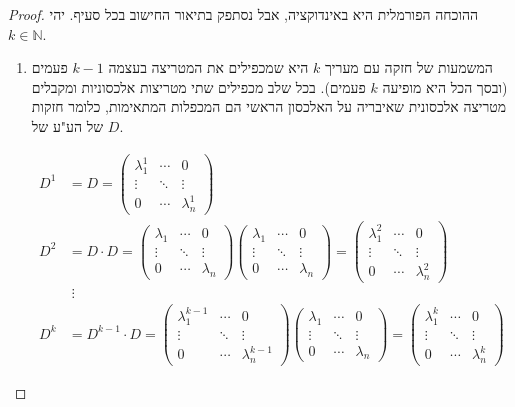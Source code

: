 \documentclass[12pt]{report}
\theoremstyle{plain}
\theoremstyle{definition}
\newcommand{\N}{\mathbb{N}}
\newcommand{\0}{\mathbf{0}}
\begin{document}
\begin{proof}
ההוכחה הפורמלית היא באינדוקציה, אבל נסתפק בתיאור החישוב בכל סעיף.
יהי 
$k\in\N$.
\begin{enumerate}[label=\alph*.]
\item 
המשמעות של חזקה עם מעריך
$k$
היא שמכפילים את המטריצה בעצמה
$k-1$
פעמים (ובסך הכל היא מופיעה 
$k$
פעמים).
בכל שלב מכפילים שתי מטריצות אלכסוניות ומקבלים מטריצה אלכסונית שאיבריה על האלכסון הראשי הם המכפלות המתאימות, כלומר חזקות של הע"ע של 
$D$.

$$
\begin{aligned}
D^1&=D=\begin{pmatrix}
\lambda_1^1 & \cdots & 0 \\
\vdots & \ddots & \vdots \\
0 & \cdots & \lambda_n^1
\end{pmatrix} \\
D^2&=D\cdot D=\begin{pmatrix}
\lambda_1 & \cdots & 0 \\
\vdots & \ddots & \vdots \\
0 & \cdots & \lambda_n
\end{pmatrix}\begin{pmatrix}
\lambda_1 & \cdots & 0 \\
\vdots & \ddots & \vdots \\
0 & \cdots & \lambda_n
\end{pmatrix}=\begin{pmatrix}
\lambda_1^2 & \cdots & 0 \\
\vdots & \ddots & \vdots \\
0 & \cdots & \lambda_n^2
\end{pmatrix} \\
&\;\vdots \\
D^k&=D^{k-1}\cdot D=\begin{pmatrix}
\lambda_1^{k-1} & \cdots & 0 \\
\vdots & \ddots & \vdots \\
0 & \cdots & \lambda_n^{k-1}
\end{pmatrix}\begin{pmatrix}
\lambda_1 & \cdots & 0 \\
\vdots & \ddots & \vdots \\
0 & \cdots & \lambda_n
\end{pmatrix}=\begin{pmatrix}
\lambda_1^k & \cdots & 0 \\
\vdots & \ddots & \vdots \\
0 & \cdots & \lambda_n^k
\end{pmatrix}
\end{aligned}
$$



\end{enumerate}
\end{proof}
\end{document}
